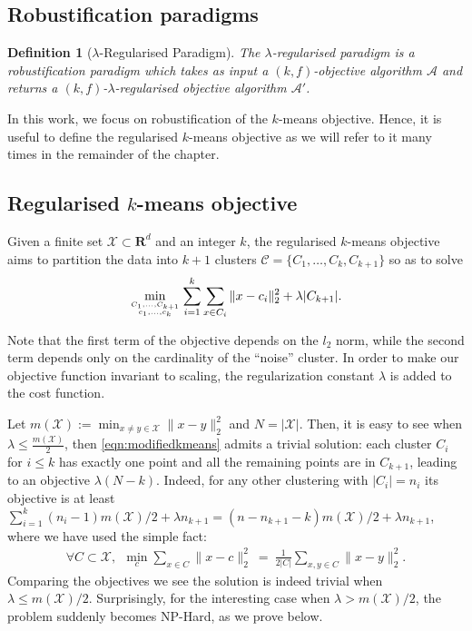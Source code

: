 \documentclass[12pt]{article}
\newcommand{\mc}{\mathcal}
\newcommand{\mb}{\mathbf}
\newtheorem{definition}[theorem]{Definition}
\begin{document}
\subsection{Robustification paradigms}
\begin{definition}[$\lambda$-Regularised Paradigm] The $\lambda$-regularised paradigm is a robustification paradigm which takes as input a $(k, f)$-objective algorithm $\mc A$ and returns a $(k, f)$-$\lambda$-regularised objective algorithm $\mc A'$.  
\end{definition}

In this work, we focus on robustification of the $k$-means objective. Hence, it is useful to define the regularised $k$-means objective as we will refer to it many times in the remainder of the chapter. 

\subsection{Regularised $k$-means objective}
Given a finite set $\mc X \subset \mb R^{d}$ and an integer $k$, the regularised $k$-means objective aims to partition the data into $k+1$ clusters $\mc C = \{C_1, \ldots, C_{k}, C_{k+1}\}$ so as to solve 
\begin{align}
	\min_{C_1,\ldots, C_{k+1} \atop c_1, \ldots, c_k} \sum_{i=1}^k \sum_{x \in C_i} \|x-c_i\|_2^2 + \lambda |C_{k+1}|.
	\label{eqn:modifiedkmeans}
\end{align}

Note that the first term of the objective depends on the $l_2$ norm, while the second term depends only on the cardinality of the ``noise'' cluster. In order to make our objective function invariant to scaling, the regularization constant $\lambda$ is added to the cost function. 

Let $m(\mc X) := \min_{x\ne y \in \mc X} \|x-y\|_2^2$ and $N = |\mc X|$. Then, it is easy to see when $\lambda \leq \frac{m(\mc X)}{2}$, then \eqref{eqn:modifiedkmeans} admits a trivial solution: each cluster $C_i$ for $i \leq k$ has exactly one point and all the remaining points are in $C_{k+1}$, leading to an objective $\lambda (N-k)$. Indeed, for any other clustering with $|C_i| = n_i$ its objective is at least $\sum_{i=1}^k (n_i-1) m(\mc X)/2 + \lambda n_{k+1} = (n-n_{k+1} - k) m(\mc X)/2 + \lambda n_{k+1}$, where we have used the simple fact:
\begin{align}
\forall C \subset \mc X, ~~
\min_{c} \sum_{x \in C} \|x - c\|_2^2 ~=~ \frac{1}{2|C|}\sum_{x, y \in C} \|x - y\|_2^2.
\end{align}
Comparing the objectives we see the solution is indeed trivial when $\lambda \leq m(\mc X) /2$. Surprisingly, for the interesting case when $\lambda > m(\mc X) /2$, the problem suddenly becomes NP-Hard, as we prove below.
\end{document}
